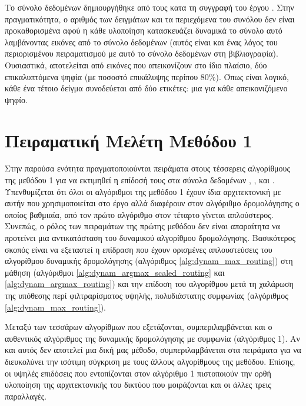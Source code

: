     Το σύνολο δεδομένων  δημιουργήθηκε από τους  κατα τη συγγραφή του έργου \cite{sabour2017dynamic}. Στην πραγματικότητα, ο αριθμός των δειγμάτων και τα περιεχόμενα του συνόλου δεν είναι προκαθορισμένα αφού η κάθε υλοποίηση κατασκευάζει δυναμικά το σύνολο αυτό λαμβάνοντας εικόνες από το σύνολο δεδομένων  (αυτός είναι και ένας λόγος του περιορισμένου πειραματισμού με αυτό το σύνολο δεδομένων στη βιβλιογραφία). Ουσιαστικά, αποτελείται από εικόνες που απεικονίζουν στο ίδιο πλαίσιο, δύο επικαλυπτόμενα ψηφία (με ποσοστό επικάλυψης περίπου 80\%). Όπως είναι λογικό, κάθε ένα τέτοιο δείγμα συνοδεύεται από δύο ετικέτες: μια για κάθε απεικονιζόμενο ψηφίο.
    

\section{Πειραματική Μελέτη Μεθόδου 1}

Στην παρούσα ενότητα πραγματοποιούνται πειράματα στους τέσσερεις αλγορίθμους της μεθόδου 1 για να εκτιμηθεί η επίδοσή τους στα σύνολα δεδομένων \cite{deng2012mnist}, \cite{Xiao2017FashionMNISTAN}, \cite{CIFAR10} και \cite{lecun2004learning}. Υπενθυμίζεται ότι όλοι οι αλγόριθμοι της μεθόδου 1 έχουν ίδια αρχιτεκτονική με αυτήν που χρησιμοποιείται στο έργο \cite{sabour2017dynamic} αλλά διαφέρουν στον αλγόριθμο δρομολόγησης ο οποίος βαθμιαία, από τον πρώτο αλγόριθμο στον τέταρτο γίνεται απλούστερος. Συνεπώς, ο ρόλος των πειραμάτων της πρώτης μεθόδου δεν είναι απαραίτητα να προτείνει μια αντικατάσταση του δυναμικού αλγορίθμου δρομολόγησης. Βασικότερος σκοπός είναι να εξεταστεί η επίδραση που έχουν ορισμένες απλουστεύσεις του αλγορίθμου δυναμικής δρομολόγησης (αλγόριθμος \ref{alg:dynam_max_routing}) στη μάθηση (αλγόριθμοι \ref{alg:dynam_argmax_scaled_routing} και \ref{alg:dynam_argmax_routing}) και την επίδοση του αλγορίθμου μετά τη χαλάρωση της υπόθεσης περί φιλτραρίσματος υψηλής, πολυδιάστατης συμφωνίας (αλγόριθμος \ref{alg:dynam_max_routing}).\par

Μεταξύ των τεσσάρων αλγορίθμων που εξετάζονται, συμπεριλαμβάνεται και ο αυθεντικός αλγόριθμος της δυναμικής δρομολόγησης με συμφωνία (αλγόριθμος 1). Αν και αυτός δεν αποτελεί μια δική μας μέθοδο, συμπεριλαμβάνεται στα πειράματα για να διευκολύνει την ισότιμη σύγκριση με τους άλλους αλγορίθμους της μεθόδου. Επίσης, οι υψηλές επιδόσεις που εντοπίζονται στον αλγόριθμο 1 πιστοποιούν την ορθή υλοποίηση της αρχιτεκτονικής του δικτύου που μοιράζονται και οι άλλες τρεις παραλλαγές.\par

